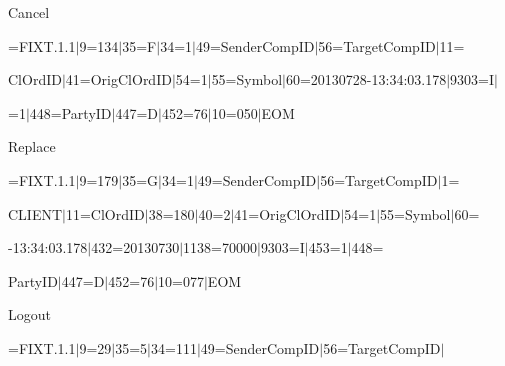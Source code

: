 {\sf   Cancel}





  \noindent


{=FIXT.1.1$\vert$9=134$\vert$35=F$\vert$34=1$\vert$49=SenderCompID$\vert$56=TargetCompID$\vert$11=}





\noindent


{\sf ClOrdID$\vert$41=OrigClOrdID$\vert$54=1$\vert$55=Symbol$\vert$60=20130728-13:34:03.178$\vert$9303=I$\vert$}





\noindent


{=1$\vert$448=PartyID$\vert$447=D$\vert$452=76$\vert$10=050$\vert$EOM}





{\sf    Replace}





  \noindent


{=FIXT.1.1$\vert$9=179$\vert$35=G$\vert$34=1$\vert$49=SenderCompID$\vert$56=TargetCompID$\vert$1=}





\noindent


{\sf CLIENT$\vert$11=ClOrdID$\vert$38=180$\vert$40=2$\vert$41=OrigClOrdID$\vert$54=1$\vert$55=Symbol$\vert$60=}





\noindent


{-13:34:03.178$\vert$432=20130730$\vert$1138=70000$\vert$9303=I$\vert$453=1$\vert$448=}





\noindent


{\sf PartyID$\vert$447=D$\vert$452=76$\vert$10=077$\vert$EOM}





{\sf   Logout}





  \noindent


{=FIXT.1.1$\vert$9=29$\vert$35=5$\vert$34=111$\vert$49=SenderCompID$\vert$56=TargetCompID$\vert$}





